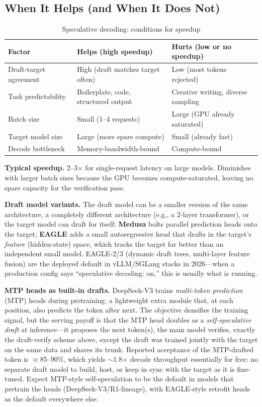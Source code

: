 \subsection{When It Helps (and When It Does Not)}

\begin{table}[H]
\centering
\caption{Speculative decoding: conditions for speedup}
\begin{tabularx}{\textwidth}{lXX}
\toprule
\textbf{Factor} & \textbf{Helps (high speedup)} & \textbf{Hurts (low or no speedup)} \\
\midrule
Draft-target agreement & High (draft matches target often) & Low (most tokens rejected) \\
Task predictability & Boilerplate, code, structured output & Creative writing, diverse sampling \\
Batch size & Small (1--4 requests) & Large (GPU already saturated) \\
Target model size & Large (more spare compute) & Small (already fast) \\
Decode bottleneck & Memory-bandwidth-bound & Compute-bound \\
\bottomrule
\end{tabularx}
\end{table}

\textbf{Typical speedup.} 2--3$\times$ for single-request latency on large models. Diminishes with larger batch sizes because the GPU becomes compute-saturated, leaving no spare capacity for the verification pass.

\textbf{Draft model variants.} The draft model can be a smaller version of the same architecture, a completely different architecture (e.g., a 2-layer transformer), or the target model can draft for itself: \textbf{Medusa} bolts parallel prediction heads onto the target; \textbf{EAGLE} adds a small autoregressive head that drafts in the target's \textit{feature} (hidden-state) space, which tracks the target far better than an independent small model. EAGLE-2/3 (dynamic draft trees, multi-layer feature fusion) are the deployed default in vLLM/SGLang stacks in 2026---when a production config says ``speculative decoding: on,'' this is usually what is running.

\textbf{MTP heads as built-in drafts.} DeepSeek-V3 trains \textit{multi-token prediction} (MTP) heads during pretraining: a lightweight extra module that, at each position, also predicts the token after next. The objective densifies the training signal, but the serving payoff is that the MTP head doubles as a \textit{self-speculative draft} at inference---it proposes the next token(s), the main model verifies, exactly the draft-verify scheme above, except the draft was trained jointly with the target on the same data and shares its trunk. Reported acceptance of the MTP-drafted token is $\approx$85--90\%, which yields $\sim$1.8$\times$ decode throughput essentially for free: no separate draft model to build, host, or keep in sync with the target as it is fine-tuned. Expect MTP-style self-speculation to be the default in models that pretrain the heads (DeepSeek-V3/R1-lineage), with EAGLE-style retrofit heads as the default everywhere else.

